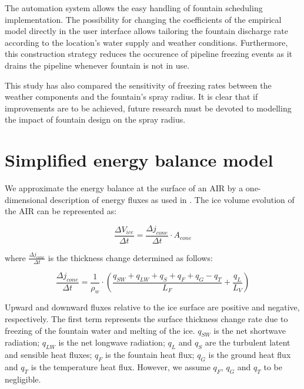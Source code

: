 \documentclass[tc, manuscript]{copernicus}
\begin{document}
The automation system allows the easy handling of fountain scheduling implementation. The possibility for
changing the coefficients of the empirical model directly in the user interface allows tailoring the fountain
discharge rate according to the location's water supply and weather conditions. Furthermore, this construction
strategy reduces the occurence of pipeline freezing events as it drains the pipeline whenever fountain is not in
use.

This study has also compared the sensitivity of freezing rates between the weather components and the fountain's
spray radius. It is clear that if improvements are to be achieved, future research must be devoted to modelling
the impact of fountain design on the spray radius.

\appendix

\section{Simplified energy balance model}

We approximate the energy balance at the surface of an AIR by a one-dimensional description of energy fluxes as
used in \cite{balasubramanianInfluenceMeteorologicalConditions2022}. The ice volume evolution of the AIR can be
represented as: 

\begin{equation}
  \frac{\Delta V_{ice}}{\Delta t}  =  \frac{\Delta j_{cone}}{ \Delta t} \cdot A_{cone}
	\label{eqn:freeze}
\end{equation}

where $\frac{\Delta j_{cone}}{\Delta t}$ is the thickness change determined as follows:

\begin{equation}
  \frac{\Delta j_{cone}}{\Delta t}  = \frac{1}{\rho_w} \cdot (\frac{q_{SW} + q_{LW} + q_{S} + q_{F} + q_{G} -
  q_{T}}{L_F} + \frac{q_{L}}{L_V} )
	\label{eqn:freeze}
\end{equation}

Upward and downward fluxes relative to the ice surface are positive and negative, respectively. The first term
represents the surface thickness change rate due to freezing of the fountain water and melting of the ice.
$q_{SW}$ is the net shortwave radiation; $q_{LW}$ is the net longwave radiation; $q_{L}$ and $q_{S}$ are the
turbulent latent and sensible heat fluxes; $q_{F}$ is the fountain heat flux; $q_{G}$ is the ground heat flux
and $q_{T}$ is the temperature heat flux. However, we assume $q_{F}$, $q_{G}$ and $q_{T}$ to be negligible.
\end{document}
